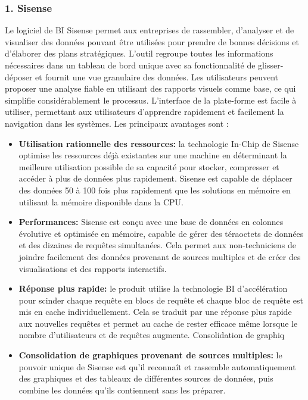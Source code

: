 \documentclass[french, a4paper, 12pt]{report}
\begin{document}
\subsubsection{1. Sisense}
Le logiciel de BI Sisense permet aux entreprises de rassembler, d’analyser et de visualiser des données pouvant être utilisées pour prendre de bonnes décisions et d’élaborer des plans stratégiques. L'outil regroupe toutes les informations nécessaires dans un tableau de bord unique avec sa fonctionnalité de glisser-déposer et fournit une vue granulaire des données. Les utilisateurs peuvent proposer une analyse fiable en utilisant des rapports visuels comme base, ce qui simplifie considérablement le processus. L’interface de la plate-forme est facile à utiliser, permettant aux utilisateurs d’apprendre rapidement et facilement la navigation dans les systèmes. Les principaux avantages sont :
\begin{itemize}
\item \textbf{Utilisation rationnelle des ressources:}  la technologie In-Chip de Sisense optimise les ressources déjà existantes sur une machine en déterminant la meilleure utilisation possible de sa capacité pour stocker, compresser et accéder à plus de données plus rapidement. Sisense est capable de déplacer des données 50 à 100 fois plus rapidement que les solutions en mémoire en utilisant la mémoire disponible dans la CPU.
\item \textbf{Performances:}  Sisense est conçu avec une base de données en colonnes évolutive et optimisée en mémoire, capable de gérer des téraoctets de données et des dizaines de requêtes simultanées. Cela permet aux non-techniciens de joindre facilement des données provenant de sources multiples et de créer des visualisations et des rapports interactifs.
\item \textbf{ Réponse plus rapide:} le produit utilise la technologie BI d'accélération pour scinder chaque requête en blocs de requête et chaque bloc de requête est mis en cache individuellement. Cela se traduit par une réponse plus rapide aux nouvelles requêtes et permet au cache de rester efficace même lorsque le nombre d'utilisateurs et de requêtes augmente.
Consolidation de graphiq
\item \textbf{Consolidation de graphiques provenant de sources multiples:}  le pouvoir unique de Sisense est qu’il reconnaît et rassemble automatiquement des graphiques et des tableaux de différentes sources de données, puis combine les données qu’ils contiennent sans les préparer.
\end{itemize} 
\end{document}

